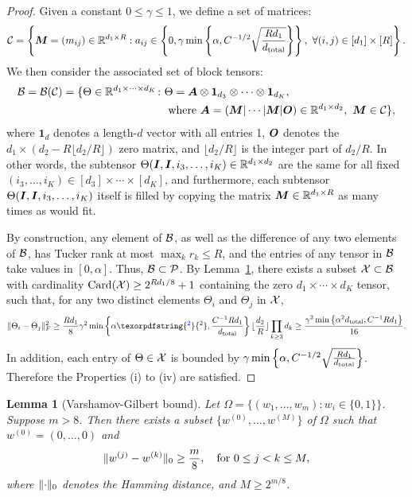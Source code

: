 \documentclass[11pt]{article}
\theoremstyle{plain}
\newtheorem{lem}{Lemma}
\theoremstyle{definition}
\providecommand{\DIFaddtex}[1]{{\protect\color{blue}\uwave{#1}}} %
\providecommand{\DIFaddbegin}{} %
\providecommand{\DIFaddend}{} %
\providecommand{\DIFadd}[1]{\texorpdfstring{\DIFaddtex{#1}}{#1}} %
\begin{document}
\begin{proof}
Given a constant $0\leq \gamma \leq 1$, we define a set of matrices:
\[
\mathcal{C}=\left\{\bm M=(m_{ij})\in\mathbb{R}^{d_1\times R}: a_{ij}\in \left\{ 0,\gamma \min\left\{ \alpha , C^{-1/2}\sqrt{Rd_1\over d_{\text{total}}} \right\}\right\} ,\  \forall (i,j)\in[d_1]\times[R]\right\}.
\]
We then consider the associated set of block tensors:
\begin{align}
\mathcal{B}=\mathcal{B}(\mathcal{C})=\{\Theta\in\mathbb{R}^{d_1\times \cdots \times d_K}\colon& \Theta=\bm A\otimes \mathbf{1}_{d_3}\otimes \cdots \otimes \mathbf{1}_{d_K}, \\
&\ \text{where}\ \bm A=(\bm M|\cdots|\bm M|\bm{O}) \in\mathbb{R}^{d_1\times d_2},\ \bm M\in\mathcal{C}\},
\end{align}
where $\mathbf{1}_d$ denotes a length-$d$ vector with all entries 1, $\bm{O}$ denotes the $d_1\times (d_2-R\lfloor d_2/R \rfloor)$ zero matrix, and $\lfloor d_2/ R \rfloor$ is the integer part of $d_2/R$. In other words, the subtensor $\Theta(\bm I, \bm I,i_3, \ldots,i_K)\in\mathbb{R}^{d_1\times d_2}$ are the same for all fixed $(i_3,\ldots,i_K)\in[d_3]\times \cdots \times [d_K]$, and furthermore, each subtensor $\Theta(\bm I,\bm I, i_3,\ldots,i_K)$ itself is filled by copying the matrix $\bm M\in\mathbb{R}^{d_1\times R}$ as many times as would fit.

By construction, any element of $\mathcal{B}$, as well as the difference of any two elements of $\mathcal{B}$, has Tucker rank at most $\max_k r_k\leq R$, and the entries of any tensor in $\mathcal{B}$ take values in $[0,\alpha]$. Thus, $\mathcal{B}\subset\mathcal{P}$. By Lemma~\ref{lem:VGbound}, there exists a subset $\mathcal{X}\subset \mathcal{B}$ with cardinality $\text{Card}(\mathcal{X})\geq 2^{Rd_1/8}+1$ containing the zero $d_1\times \cdots \times d_K$ tensor, such that, for any two distinct elements $\Theta_i$ and $\Theta_j$ in $\mathcal{X}$,
\[
\FnormSize{}{\Theta_i-\Theta_j}^2 \geq {Rd_1\over 8} \gamma^2\min\left\{ \alpha\DIFaddbegin \DIFadd{^2}\DIFaddend , {C^{-1}Rd_1 \over d_{\text{total}}}\right\} \lfloor {d_2\over R} \rfloor \prod_{k\geq 3}d_k\geq {\gamma^2\min\left\{ \alpha^2 d_{\text{total}}, C^{-1}Rd_1\right\}  \over 16}.
\]
In addition, each entry of $\Theta\in\mathcal{X}$ is bounded by $\gamma \min\left\{ \alpha , C^{-1/2}\sqrt{Rd_1\over d_{\text{total}}}\right\} $. Therefore the Properties (i) to (iv) are satisfied.
\end{proof}



\begin{lem}[Varshamov-Gilbert bound]\label{lem:VGbound}
Let $\Omega=\{(w_1,\ldots,w_m)\colon w_i\in\{0,1\}\}$. Suppose $m>8$. Then there exists a subset $\{w^{(0)},\ldots,w^{(M)}\}$ of $\Omega$ such that $w^{(0)}=(0,\ldots,0)$ and
\[
\lVert w^{(j)}-w^{(k)}\rVert_0\geq {m\over 8},\quad \text{for} \ 0\leq j<k\leq M,
\]
where $\lVert\cdot\rVert_0$ denotes the Hamming distance, and $M\geq 2^{m/8}$.
\end{lem}
\end{document}
